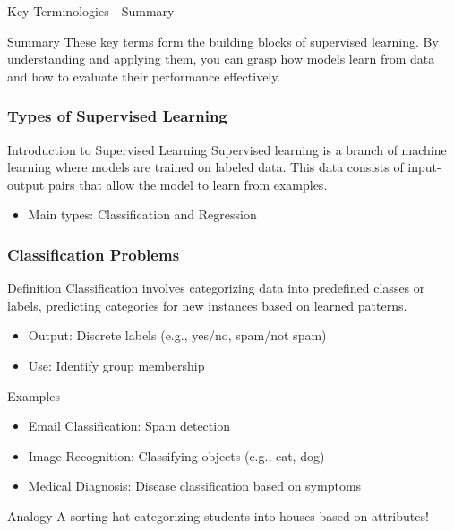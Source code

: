 \documentclass[aspectratio=169]{beamer}
\begin{document}
\begin{frame}[fragile]{Key Terminologies - Summary}
    \begin{block}{Summary}
        These key terms form the building blocks of supervised learning. By understanding and applying them, you can grasp how models learn from data and how to evaluate their performance effectively.
    \end{block}
\end{frame}

\begin{frame}[fragile]
    \frametitle{Types of Supervised Learning}
    \begin{block}{Introduction to Supervised Learning}
        Supervised learning is a branch of machine learning where models are trained on labeled data. This data consists of input-output pairs that allow the model to learn from examples.
    \end{block}
    \begin{itemize}
        \item Main types: Classification and Regression
    \end{itemize}
\end{frame}

\begin{frame}[fragile]
    \frametitle{Classification Problems}
    \begin{block}{Definition}
        Classification involves categorizing data into predefined classes or labels, predicting categories for new instances based on learned patterns.
    \end{block}
    \begin{itemize}
        \item Output: Discrete labels (e.g., yes/no, spam/not spam)
        \item Use: Identify group membership
    \end{itemize}
    \begin{block}{Examples}
        \begin{itemize}
            \item Email Classification: Spam detection
            \item Image Recognition: Classifying objects (e.g., cat, dog)
            \item Medical Diagnosis: Disease classification based on symptoms
        \end{itemize}
    \end{block}
    \begin{block}{Analogy}
        A sorting hat categorizing students into houses based on attributes!
    \end{block}
\end{frame}
\end{document}
